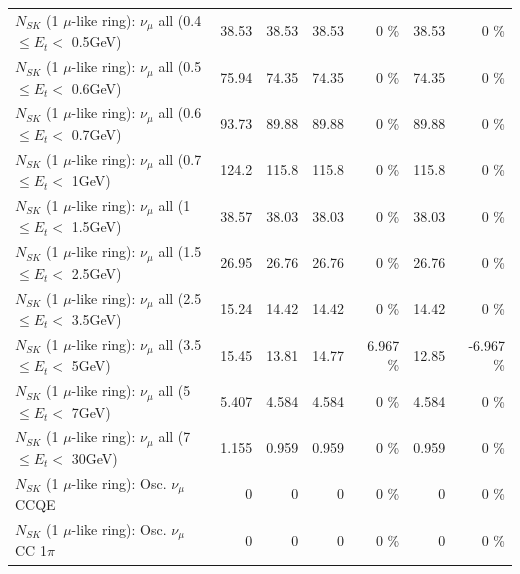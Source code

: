 \begin{table}
\begin{tabular}{| l | r | r | r  r | r  r |}
       $N_{SK}$ (1 $\mu$-like ring): $\nu_{\mu}$ all (0.4 $\leq E_{t} <$ 0.5GeV) &           38.53 &           38.53 &           38.53 &        0 \%  &           38.53 &        0 \%  \\ 
       $N_{SK}$ (1 $\mu$-like ring): $\nu_{\mu}$ all (0.5 $\leq E_{t} <$ 0.6GeV) &           75.94 &           74.35 &           74.35 &        0 \%  &           74.35 &        0 \%  \\ 
       $N_{SK}$ (1 $\mu$-like ring): $\nu_{\mu}$ all (0.6 $\leq E_{t} <$ 0.7GeV) &           93.73 &           89.88 &           89.88 &        0 \%  &           89.88 &        0 \%  \\ 
         $N_{SK}$ (1 $\mu$-like ring): $\nu_{\mu}$ all (0.7 $\leq E_{t} <$ 1GeV) &           124.2 &           115.8 &           115.8 &        0 \%  &           115.8 &        0 \%  \\ 
         $N_{SK}$ (1 $\mu$-like ring): $\nu_{\mu}$ all (1 $\leq E_{t} <$ 1.5GeV) &           38.57 &           38.03 &           38.03 &        0 \%  &           38.03 &        0 \%  \\ 
       $N_{SK}$ (1 $\mu$-like ring): $\nu_{\mu}$ all (1.5 $\leq E_{t} <$ 2.5GeV) &           26.95 &           26.76 &           26.76 &        0 \%  &           26.76 &        0 \%  \\ 
       $N_{SK}$ (1 $\mu$-like ring): $\nu_{\mu}$ all (2.5 $\leq E_{t} <$ 3.5GeV) &           15.24 &           14.42 &           14.42 &        0 \%  &           14.42 &        0 \%  \\ 
         $N_{SK}$ (1 $\mu$-like ring): $\nu_{\mu}$ all (3.5 $\leq E_{t} <$ 5GeV) &           15.45 &           13.81 &           14.77 &    6.967 \%  &           12.85 &   -6.967 \%  \\ 
           $N_{SK}$ (1 $\mu$-like ring): $\nu_{\mu}$ all (5 $\leq E_{t} <$ 7GeV) &           5.407 &           4.584 &           4.584 &        0 \%  &           4.584 &        0 \%  \\ 
          $N_{SK}$ (1 $\mu$-like ring): $\nu_{\mu}$ all (7 $\leq E_{t} <$ 30GeV) &           1.155 &           0.959 &           0.959 &        0 \%  &           0.959 &        0 \%  \\ 
\hline
\hline
                               $N_{SK}$ (1 $\mu$-like ring): Osc. $\nu_\mu$ CCQE &               0 &               0 &               0 &        0 \%  &               0 &        0 \%  \\ 
                          $N_{SK}$ (1 $\mu$-like ring): Osc. $\nu_\mu$ CC 1$\pi$ &               0 &               0 &               0 &        0 \%  &               0 &        0 \%  \\ 

\end{tabular}
\end{table}

